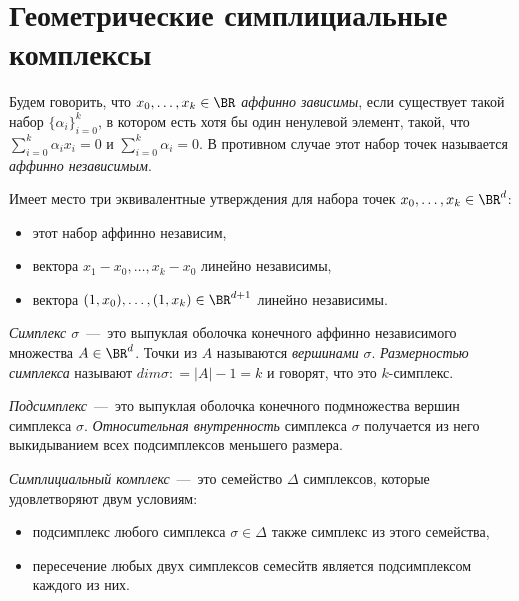 \section{Геометрические симплициальные комплексы}

\begin{definition}
	Будем говорить, что $x_0, \dots, x_k \in \BR$ \emph{аффинно зависимы}, если существует такой набор $\lbrace \alpha_i \rbrace_{i = 0}^{k}$, в котором есть хотя бы один ненулевой элемент, такой, что $\sum_{i = 0}^{k} \alpha_i x_i = 0$ и $\sum_{i=0}^{k} \alpha_i = 0$. В противном случае этот набор точек называется \emph{аффинно независимым}.
\end{definition}

\begin{lemma}
	Имеет место три эквивалентные утверждения для набора точек $x_0, \dots, x_k \in \BR^d$:
\begin{itemize}
	\item этот набор аффинно независим,
	\item вектора $x_1 - x_0, \dots, x_k - x_0$ линейно независимы,
	\item вектора $(1, x_0), \dots, (1, x_k) \in \BR^{d+1}$ линейно независимы.
\end{itemize}
\end{lemma}

\begin{definition}
	\emph{Симплекс $\sigma$}~---~это выпуклая оболочка конечного аффинно независимого множества $A \in \BR^d$. Точки из $A$ называются \emph{вершинами} $\sigma$.  \emph{Размерностью симплекса} называют $dim \sigma \colon = |A| - 1 = k$ и говорят, что это $k$-симплекс.
\end{definition}

\begin{definition}
	\emph{Подсимплекс}~---~это выпуклая оболочка конечного подмножества вершин симплекса $\sigma$. \emph{Относительная внутренность} симплекса $\sigma$ получается из него выкидыванием всех подсимплексов меньшего размера.
\end{definition}

\begin{definition}
	\emph{Симплициальный комплекс}~---~это семейство $\Delta$ симплексов, которые удовлетворяют двум условиям:
\begin{itemize}
	\item подсимплекс любого симплекса $\sigma \in \Delta$ также симплекс из этого семейства,
	\item пересечение любых двух симплексов семесйтв является подсимплексом каждого из них.
\end{itemize}
\end{definition}

